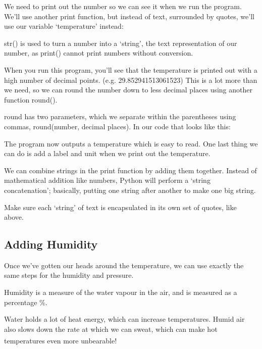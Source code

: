 	We need to print out the number so we can see it when we run the program. We'll use another print function, but instead of text, surrounded by quotes, we'll use our variable `temperature' instead:
	
	
	
	str() is used to turn a number into a `string', the text representation of our number, as print() cannot print numbers without conversion.
	
	When you run this program, you'll see that the temperature is printed out with a high number of decimal points. (e.g. 29.852941513061523)
	This is a lot more than we need, so we can round the number down to less decimal places using another function round().
	
	round has two parameters, which we separate within the parentheses using commas, round(number, decimal places). In our code that looks like this:
	
	
	
	The program now outputs a temperature which is easy to read.
	One last thing we can do is add a label and unit when we print out the temperature.
	
	We can combine strings in the print function by adding them together.
	Instead of mathematical addition like numbers, Python will perform a `string concatenation'; basically, putting one string after another to make one big string.
	
	
	
	Make sure each `string' of text is encapsulated in its own set of quotes, like above.
	
	\subsection*{Adding Humidity}
	
	Once we've gotten our heads around the temperature, we can use exactly the same steps for the humidity and pressure.
	
	\begin{aside}[Humidity]
		Humidity is a measure of the water vapour in the air, and is measured as a percentage \%.
		
		Water holds a lot of heat energy, which can increase temperatures. Humid air also slows down the rate at which we can sweat, which can make hot temperatures even more unbearable!\textsuperscript{\cite{humidity}}
	\end{aside}
	
